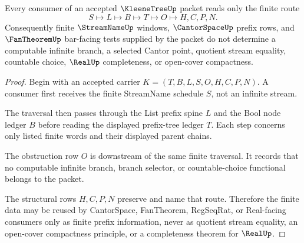 \begin{theorem}
\label{thm:kleene-tree-streamname-path-boundary}
Every consumer of an accepted $\KleeneTreeUp$ packet reads only the finite route
$$
S \longmapsto L \longmapsto B \longmapsto T \longmapsto O \longmapsto H,C,P,N .
$$
Consequently finite $\StreamNameUp$ windows, $\CantorSpaceUp$ prefix rows, and $\FanTheoremUp$ bar-facing tests supplied by the packet do not determine a computable infinite branch, a selected Cantor point, quotient stream equality, countable choice, $\RealUp$ completeness, or open-cover compactness.
\end{theorem}
\begin{proof}
Begin with an accepted carrier $K=(T,B,L,S,O,H,C,P,N)$. A consumer first receives the finite StreamName schedule $S$, not an infinite stream.

The traversal then passes through the List prefix spine $L$ and the Bool node ledger $B$ before reading the displayed prefix-tree ledger $T$. Each step concerns only listed finite words and their displayed parent chains.

The obstruction row $O$ is downstream of the same finite traversal. It records that no computable infinite branch, branch selector, or countable-choice functional belongs to the packet.

The structural rows $H,C,P,N$ preserve and name that route. Therefore the finite data may be reused by CantorSpace, FanTheorem, RegSeqRat, or Real-facing consumers only as finite prefix information, never as quotient stream equality, an open-cover compactness principle, or a completeness theorem for $\RealUp$.
\end{proof}

